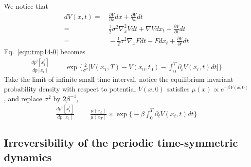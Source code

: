 \documentclass[journal=jctcce,manuscript=article]{achemso}
\newcommand{\mymu}{\mu}
\begin{document}
We notice that
\begin{align}\nonumber
  dV(x, t) = &\, \frac{\partial V}{\partial x} dx + \frac{\partial V}{\partial t} dt\\\nonumber
  =&\,
  \frac12 \sigma^2 \nabla^2_x V dt +  \nabla V dx_t + \frac{\partial V}{\partial t} dt \\
  =&\,
  -\frac12 \sigma^2 \nabla_x F dt -  F dx_t + \frac{\partial V}{\partial t} dt
\end{align}
Eq.~\eqref{eqn:tmp14-0} becomes
\begin{align}
  \frac{  dp^\dagger[x^\dagger_t] }{ dp[x_t]}
  =&\,
  \exp\bigg\{
  \frac2{\sigma^2}\bigg[
  V(x_T,T) - V(x_0,t_0) - \int_0^T\partial_tV(x_t,t)dt
  \bigg]
  \bigg\}
\end{align}
Take the limit of infinite small time interval, notice the equilibrium
invariant probability density with respect to potential $V(x,0)$ satisfies $\mymu(x) \propto e^{-\beta V(x,0)}$, and replace $\sigma^2$ by $2\beta^{-1}$,
\begin{align}
  \frac{  dp^\dagger[x^\dagger_t] }{ dp[x_t]}
  =&\,
  \frac{\mymu(x_0)}{\mymu(x_T)}\times
  \exp\bigg\{
  - \beta\int_0^T\partial_tV(x_t,t)dt
  \bigg\}
\end{align}

\subsection{Irreversibility of the periodic time-symmetric dynamics}
\end{document}
